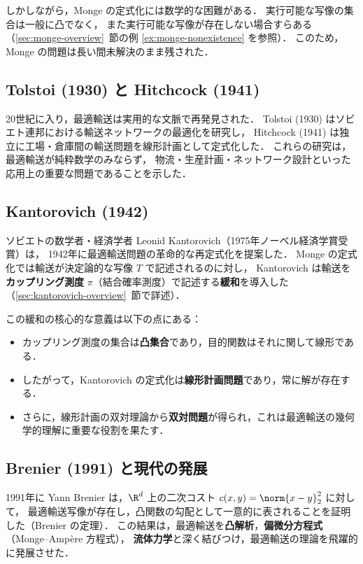 しかしながら，Monge の定式化には数学的な困難がある．
実行可能な写像の集合は一般に凸でなく，
また実行可能な写像が存在しない場合すらある（\ref{sec:monge-overview}~節の例 \ref{ex:monge-nonexistence} を参照）．
このため，Monge の問題は長い間未解決のまま残された．

\subsection*{Tolstoi (1930) と Hitchcock (1941)}

20世紀に入り，最適輸送は実用的な文脈で再発見された．
Tolstoi (1930) はソビエト連邦における輸送ネットワークの最適化を研究し，
Hitchcock (1941) は独立に工場・倉庫間の輸送問題を線形計画として定式化した．
これらの研究は，最適輸送が純粋数学のみならず，
物流・生産計画・ネットワーク設計といった応用上の重要な問題であることを示した．

\subsection*{Kantorovich (1942)}

ソビエトの数学者・経済学者 Leonid Kantorovich（1975年ノーベル経済学賞受賞）は，
1942年に最適輸送問題の革命的な再定式化を提案した．
Monge の定式化では輸送が決定論的な写像 $T$ で記述されるのに対し，
Kantorovich は輸送を\textbf{カップリング測度} $\pi$（結合確率測度）で記述する\textbf{緩和}を導入した
（\ref{sec:kantorovich-overview}~節で詳述）．

この緩和の核心的な意義は以下の点にある：
\begin{itemize}
  \item カップリング測度の集合は\textbf{凸集合}であり，目的関数はそれに関して線形である．
  \item したがって，Kantorovich の定式化は\textbf{線形計画問題}であり，常に解が存在する．
  \item さらに，線形計画の双対理論から\textbf{双対問題}が得られ，これは最適輸送の幾何学的理解に重要な役割を果たす．
\end{itemize}

\subsection*{Brenier (1991) と現代の発展}

1991年に Yann Brenier は，$\R^d$ 上の二次コスト $c(x,y) = \norm{x-y}_2^2$ に対して，
最適輸送写像が存在し，凸関数の勾配として一意的に表されることを証明した（Brenier の定理）．
この結果は，最適輸送を\textbf{凸解析}，\textbf{偏微分方程式}（Monge--Amp\`{e}re 方程式），
\textbf{流体力学}と深く結びつけ，最適輸送の理論を飛躍的に発展させた．

